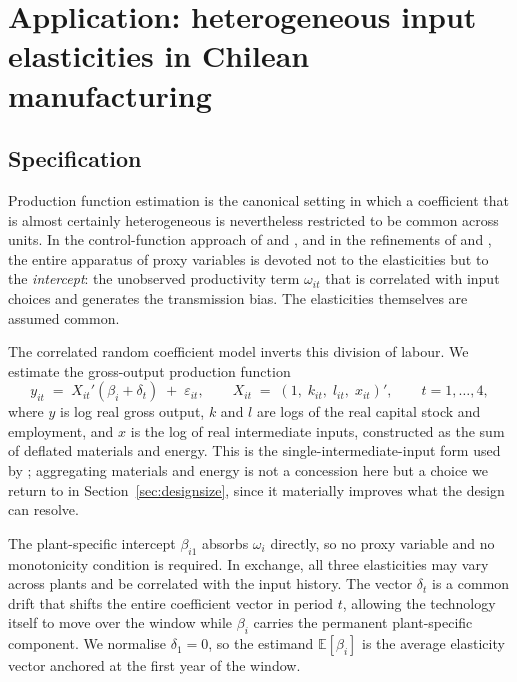 
\section{Application: heterogeneous input elasticities in Chilean
manufacturing}
\label{sec:chile}

\subsection{Specification}

Production function estimation is the canonical setting in which a coefficient
that is almost certainly heterogeneous is nevertheless restricted to be common
across units. In the control-function approach of \citet{OlleyPakes1996} and
\citet{LevinsohnPetrin2003}, and in the refinements of \citet{ACF2015} and
\citet{GNR2020}, the entire apparatus of proxy variables is devoted not to the
elasticities but to the \emph{intercept}: the unobserved productivity term
$\omega_{it}$ that is correlated with input choices and generates the
transmission bias. The elasticities themselves are assumed common.

The correlated random coefficient model inverts this division of labour. We
estimate the gross-output production function
\begin{equation}
  y_{it} \;=\; X_{it}'(\beta_i + \delta_t) \;+\; \varepsilon_{it},
  \qquad
  X_{it} \;=\; (1,\; k_{it},\; l_{it},\; x_{it})',
  \qquad t = 1,\dots,4,
  \label{eq:klm}
\end{equation}
where $y$ is log real gross output, $k$ and $l$ are logs of the real capital
stock and employment, and $x$ is the log of real intermediate inputs,
constructed as the sum of deflated materials and energy. This is the
single-intermediate-input form used by \citet{GNR2020}; aggregating materials
and energy is not a concession here but a choice we return to in
Section~\ref{sec:designsize}, since it materially improves what the design can
resolve.

The plant-specific intercept $\beta_{i1}$ absorbs $\omega_i$ directly, so no
proxy variable and no monotonicity condition is required. In exchange, all
three elasticities may vary across plants and be correlated with the input
history. The vector $\delta_t$ is a common drift that shifts the entire
coefficient vector in period $t$, allowing the technology itself to move over
the window while $\beta_i$ carries the permanent plant-specific component. We
normalise $\delta_1 = 0$, so the estimand $\mathbb{E}[\beta_i]$ is the average
elasticity vector anchored at the first year of the window.

